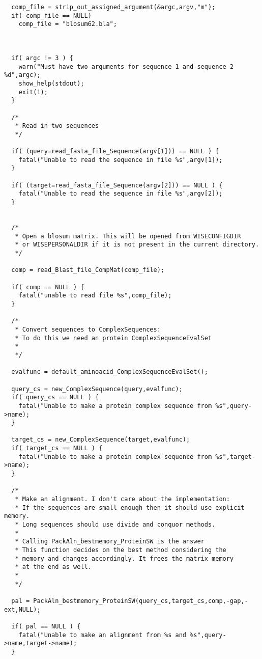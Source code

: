 \begin{verbatim}
  comp_file = strip_out_assigned_argument(&argc,argv,"m");
  if( comp_file == NULL)
    comp_file = "blosum62.bla";

  
  
  if( argc != 3 ) {
    warn("Must have two arguments for sequence 1 and sequence 2 %d",argc);
    show_help(stdout);
    exit(1);
  }
  
  /*
   * Read in two sequences
   */
  
  if( (query=read_fasta_file_Sequence(argv[1])) == NULL ) {
    fatal("Unable to read the sequence in file %s",argv[1]);
  }
  
  if( (target=read_fasta_file_Sequence(argv[2])) == NULL ) {
    fatal("Unable to read the sequence in file %s",argv[2]);
  }
  
  
  /*
   * Open a blosum matrix. This will be opened from WISECONFIGDIR
   * or WISEPERSONALDIR if it is not present in the current directory.
   */
  
  comp = read_Blast_file_CompMat(comp_file);
  
  if( comp == NULL ) {
    fatal("unable to read file %s",comp_file);
  }
  
  /*
   * Convert sequences to ComplexSequences: 
   * To do this we need an protein ComplexSequenceEvalSet
   *
   */
  
  evalfunc = default_aminoacid_ComplexSequenceEvalSet();
  
  query_cs = new_ComplexSequence(query,evalfunc);
  if( query_cs == NULL ) {
    fatal("Unable to make a protein complex sequence from %s",query->name);
  }
  
  target_cs = new_ComplexSequence(target,evalfunc);
  if( target_cs == NULL ) {
    fatal("Unable to make a protein complex sequence from %s",target->name);
  }
  
  /*
   * Make an alignment. I don't care about the implementation:
   * If the sequences are small enough then it should use explicit memory.
   * Long sequences should use divide and conquor methods.
   *
   * Calling PackAln_bestmemory_ProteinSW is the answer
   * This function decides on the best method considering the
   * memory and changes accordingly. It frees the matrix memory 
   * at the end as well.
   *
   */     

  pal = PackAln_bestmemory_ProteinSW(query_cs,target_cs,comp,-gap,-ext,NULL);

  if( pal == NULL ) {
    fatal("Unable to make an alignment from %s and %s",query->name,target->name);
  }


\end{verbatim}
